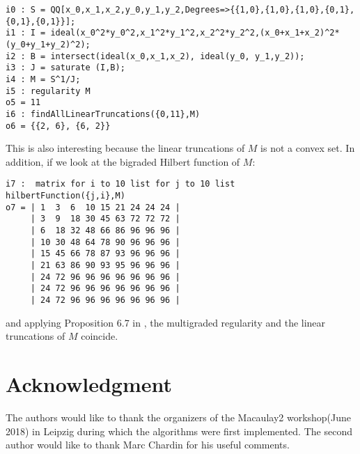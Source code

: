 \documentclass[11pt]{amsart}
\theoremstyle{definition}
\begin{document}
\begin{footnotesize}
 \begin{verbatim}
i0 : S = QQ[x_0,x_1,x_2,y_0,y_1,y_2,Degrees=>{{1,0},{1,0},{1,0},{0,1},{0,1},{0,1}}];
i1 : I = ideal(x_0^2*y_0^2,x_1^2*y_1^2,x_2^2*y_2^2,(x_0+x_1+x_2)^2*(y_0+y_1+y_2)^2);
i2 : B = intersect(ideal(x_0,x_1,x_2), ideal(y_0, y_1,y_2));
i3 : J = saturate (I,B);
i4 : M = S^1/J;
i5 : regularity M
o5 = 11
i6 : findAllLinearTruncations({0,11},M)
o6 = {{2, 6}, {6, 2}}
\end{verbatim}
\end{footnotesize}
This  is also interesting because the linear truncations of $M$ is not a convex set. In addition, if we look at the bigraded Hilbert function of $M$:
\begin{footnotesize}
 \begin{verbatim}
i7 :  matrix for i to 10 list for j to 10 list hilbertFunction({j,i},M)
o7 = | 1  3  6  10 15 21 24 24 24 |
     | 3  9  18 30 45 63 72 72 72 |
     | 6  18 32 48 66 86 96 96 96 |
     | 10 30 48 64 78 90 96 96 96 |
     | 15 45 66 78 87 93 96 96 96 |
     | 21 63 86 90 93 95 96 96 96 |
     | 24 72 96 96 96 96 96 96 96 |
     | 24 72 96 96 96 96 96 96 96 |
     | 24 72 96 96 96 96 96 96 96 |
\end{verbatim}
\end{footnotesize}
and applying Proposition 6.7 in \cite{MaclagenSmith}, the multigraded regularity and the linear truncations of $M$ coincide.


\section{Acknowledgment}
The authors would like to thank the organizers of the Macaulay2 workshop(June 2018) in Leipzig during which the algorithms were first implemented. The second author would like to thank Marc Chardin for his useful comments.




\end{document}
